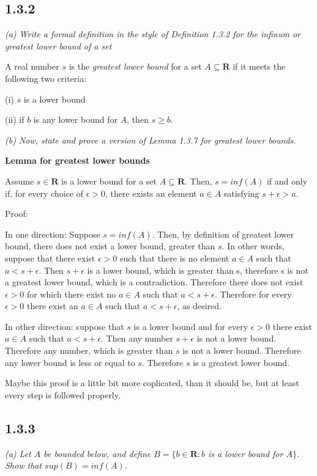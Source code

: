 \documentclass[11pt,oneside,titlepage]{book}
\begin{document}
\subsection*{1.3.2}
\textit{(a) Write a formal definition in the style of Definition 1.3.2 for the
  infinum or greatest lower bound of a set}

A real number $s$ is the \textit{greatest lower bound} for a set
$A \subseteq \textbf{R}$ if it meets the following two criteria:

(i) $s$ is a lower bound

(ii) if $b$ is any lower bound for $A$, then $s \geq b$.

\textit{(b) Now, state and prove a version of Lemma 1.3.7 for greatest lower
  bounds.}

\textbf{Lemma for greatest lower bounds}

Assume $s \in \textbf{R}$ is a lower bound for a set  $A \subseteq \textbf{R}$.
Then, $s = inf(A)$ if and only if, for every choice of $\epsilon > 0$, there
exists an element $a \in A$ satisfying $s + \epsilon > a$.

Proof:

In one direction: Suppose $s = inf(A)$. Then, by definition of greatest lower
bound, there does not exist a lower bound, greater than $s$. In other words,
suppose that there exist $\epsilon > 0$ such that there is no element $a \in A$
such that $a < s + \epsilon$. Then $s + \epsilon$ is a lower bound, which is
greater than s, therefore s is not a greatest lower bound, which is a
contradiction. Therefore there does not exist $\epsilon > 0$ for which
there exist no $a \in A$ such that $a < s + \epsilon$. Therefore for
every $\epsilon > 0$ there exist an $a \in A$  such that $a < s + \epsilon$,
as desired.

In other direction: suppose that $s$ is a lower bound and for every $\epsilon
> 0$ there exist $a \in A$ such that $a < s + \epsilon$. Then any number
$s + \epsilon$ is not a lower bound. Therefore any number, which is greater
than $s$ is not a lower bound. Therefore any lower bound is less or equal to
$s$. Therefore $s$ is a greatest lower bound.

Maybe this proof is a little bit more coplicated, than it should be, but
at least every step is followed properly.

\subsection*{1.3.3}
\textit{(a) Let $A$ be bounded below, and define $B = \{b \in \textbf{R}:
  b $ is a lower bound for $A\}$. Show that $sup(B) = inf(A)$.}
\end{document}
